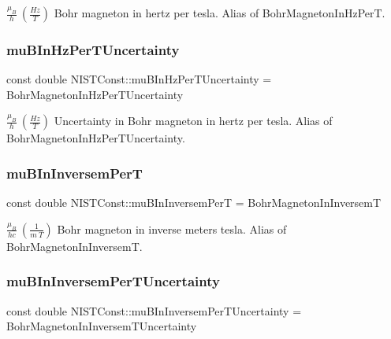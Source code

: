 $\frac{\mu_B}{h} \ (\frac{Hz}{T})$ Bohr magneton in hertz per tesla. Alias of Bohr\+Magneton\+In\+Hz\+PerT. \mbox{\label{group___bohr_magneton_gadcf78ed6cafce3517c8dc7d308c06cc2}} 
\subsubsection{\texorpdfstring{mu\+B\+In\+Hz\+Per\+T\+Uncertainty}{muBInHzPerTUncertainty}}
{\footnotesize\ttfamily const double N\+I\+S\+T\+Const\+::mu\+B\+In\+Hz\+Per\+T\+Uncertainty = Bohr\+Magneton\+In\+Hz\+Per\+T\+Uncertainty}

$\frac{\mu_B}{h} \ (\frac{Hz}{T})$ Uncertainty in Bohr magneton in hertz per tesla. Alias of Bohr\+Magneton\+In\+Hz\+Per\+T\+Uncertainty. \mbox{\label{group___bohr_magneton_ga4d426841ef01963272df91bd0534a966}} 
\subsubsection{\texorpdfstring{mu\+B\+In\+Inversem\+PerT}{muBInInversemPerT}}
{\footnotesize\ttfamily const double N\+I\+S\+T\+Const\+::mu\+B\+In\+Inversem\+PerT = Bohr\+Magneton\+In\+InversemT}

$\frac{\mu_B}{hc} \ (\frac{1}{m\ T})$ Bohr magneton in inverse meters tesla. Alias of Bohr\+Magneton\+In\+InversemT. \mbox{\label{group___bohr_magneton_ga51cabaa66ef3fd011187bc9ad5226cc8}} 
\subsubsection{\texorpdfstring{mu\+B\+In\+Inversem\+Per\+T\+Uncertainty}{muBInInversemPerTUncertainty}}
{\footnotesize\ttfamily const double N\+I\+S\+T\+Const\+::mu\+B\+In\+Inversem\+Per\+T\+Uncertainty = Bohr\+Magneton\+In\+Inversem\+T\+Uncertainty}


